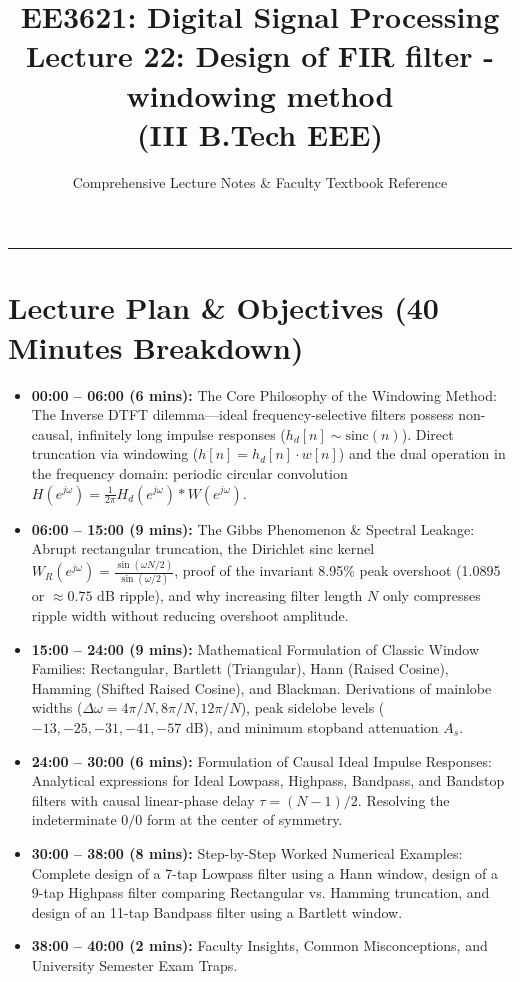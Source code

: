 \documentclass[11pt,a4paper]{article}
\title{\textbf{EE3621: Digital Signal Processing} \\ \Large Lecture 22: Design of FIR filter - windowing method \\ \large (III B.Tech EEE)}
\author{Comprehensive Lecture Notes \& Faculty Textbook Reference}
\date{}
\begin{document}
\maketitle

\noindent\rule{\textwidth}{0.5pt}

\section*{Lecture Plan \& Objectives (40 Minutes Breakdown)}
\begin{itemize}
    \item \textbf{00:00 -- 06:00 (6 mins):} The Core Philosophy of the Windowing Method: The Inverse DTFT dilemma—ideal frequency-selective filters possess non-causal, infinitely long impulse responses ($h_d[n] \sim \text{sinc}(n)$). Direct truncation via windowing ($h[n] = h_d[n] \cdot w[n]$) and the dual operation in the frequency domain: periodic circular convolution $H(e^{j\omega}) = \frac{1}{2\pi} H_d(e^{j\omega}) * W(e^{j\omega})$.
    \item \textbf{06:00 -- 15:00 (9 mins):} The Gibbs Phenomenon \& Spectral Leakage: Abrupt rectangular truncation, the Dirichlet sinc kernel $W_R(e^{j\omega}) = \frac{\sin(\omega N/2)}{\sin(\omega/2)}$, proof of the invariant 8.95\% peak overshoot (1.0895 or $\approx 0.75$ dB ripple), and why increasing filter length $N$ only compresses ripple width without reducing overshoot amplitude.
    \item \textbf{15:00 -- 24:00 (9 mins):} Mathematical Formulation of Classic Window Families: Rectangular, Bartlett (Triangular), Hann (Raised Cosine), Hamming (Shifted Raised Cosine), and Blackman. Derivations of mainlobe widths ($\Delta\omega = 4\pi/N, 8\pi/N, 12\pi/N$), peak sidelobe levels ($-13, -25, -31, -41, -57$ dB), and minimum stopband attenuation $A_s$.
    \item \textbf{24:00 -- 30:00 (6 mins):} Formulation of Causal Ideal Impulse Responses: Analytical expressions for Ideal Lowpass, Highpass, Bandpass, and Bandstop filters with causal linear-phase delay $\tau = (N-1)/2$. Resolving the indeterminate $0/0$ form at the center of symmetry.
    \item \textbf{30:00 -- 38:00 (8 mins):} Step-by-Step Worked Numerical Examples: Complete design of a 7-tap Lowpass filter using a Hann window, design of a 9-tap Highpass filter comparing Rectangular vs. Hamming truncation, and design of an 11-tap Bandpass filter using a Bartlett window.
    \item \textbf{38:00 -- 40:00 (2 mins):} Faculty Insights, Common Misconceptions, and University Semester Exam Traps.
\end{itemize}
\end{document}

